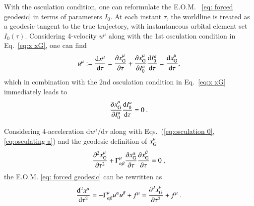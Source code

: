 \documentclass[aps,prx,reprint,superscriptaddress,nofootinbib,longbibliography]{revtex4-1}
\begin{document}

With the osculation condition, one can reformulate the E.O.M. ~\eqref{eq: forced geodesic} in terms of parameters $I_0$.
At each instant $\tau$, the worldline is treated as a geodesic tangent to the true trajectory, with instantaneous orbital element set $I_{0}(\tau)$.
Considering 4-velocity $u^\mu$ along with the 1st osculation condition in  Eq.~\eqref{eq:x xG}, one can find \cite{PhysRevD.77.044013}
\begin{equation}
    u^{\mu}:=\dv{x^{\mu}}{\tau}=\pdv{x^{\mu}_{\rm G}}{\tau}+\pdv{x^{\mu}_{\rm G}}{I_{0}^a}\dv{I_{0}^a}{\tau}=\dv{x^{\mu}_{\rm G}}{\tau},
    \label{eq:osculation 0}
\end{equation}
which in combination with the 2nd osculation condition in  Eq.~\eqref{eq:x xG} immediately leads to 
\begin{equation}
    \pdv{x^{\mu}_{\rm G}}{I_{0}^{a}}\dv{I_{0}^a}{\tau}=0 \ .
    \label{eq:osculating a}
\end{equation}

Considering 4-acceleration $\mathrm{d}u^\mu/\mathrm{d}\tau$ along with  Eqs.~(\ref{eq:osculation 0}, \ref{eq:osculating a}) and 
the geodesic definition of $x^{\mu}_{\rm G}$ 
\begin{equation}
    \pdv[2]{x_{\rm G}^{\mu}}{\tau}+\Gamma^{\mu}_{\alpha\beta}\pdv{x_{\rm G}^{\alpha}}{\tau}\pdv{x_{\rm G}^{\beta}}{\tau}=0 \ ,
\end{equation}
the E.O.M. \eqref{eq: forced geodesic} can be rewritten as 
\begin{equation}
     \dv[2]{x^{\mu}}{\tau}=-\Gamma^\mu_{\alpha\beta} u^\alpha u^\beta + f^\mu = \pdv[2]{x_{\rm G}^{\mu}}{\tau}+f^{\mu}\ .
     \label{eq:dv2xmutaufmu}
\end{equation}
\end{document}
